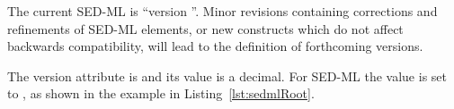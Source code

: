 \subsubsection{}
\label{sec:version}
The current SED-ML  is ``version \version''. Minor revisions containing corrections and refinements of SED-ML elements, or new constructs which do not affect backwards compatibility, will lead to the definition of forthcoming versions.

The version attribute is  and its value is a  decimal. For SED-ML \LoneVtwo the value is set to , as shown in the example in Listing~\ref{lst:sedmlRoot}.

